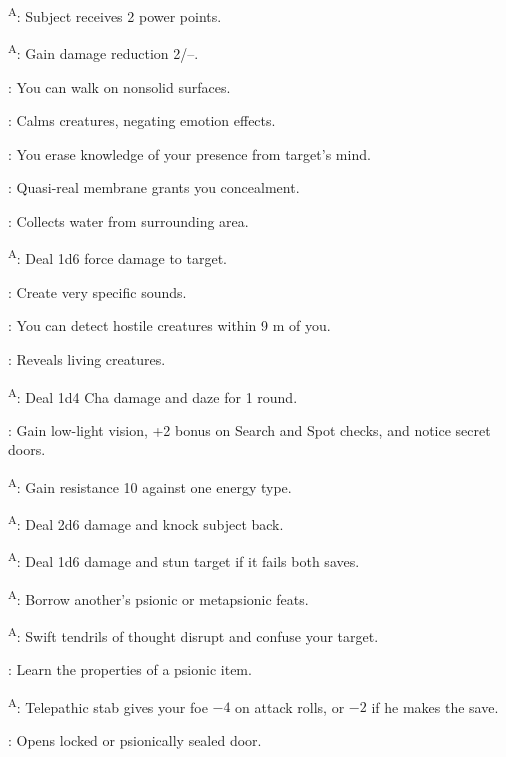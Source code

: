 \textsuperscript{A}: Subject receives 2 power points.

\textsuperscript{A}: Gain damage reduction 2/--.

: You can walk on nonsolid surfaces.

: Calms creatures, negating emotion effects.

: You erase knowledge of your presence from target's mind.

: Quasi-real membrane grants you concealment.

: Collects water from surrounding area.

\textsuperscript{A}: Deal 1d6 force damage to target.

: Create very specific sounds.

: You can detect hostile creatures within 9 m of you.

: Reveals living creatures.

\textsuperscript{A}: Deal 1d4 Cha damage and daze for 1 round.

: Gain low-light vision, +2 bonus on Search and Spot checks, and notice secret doors.

\textsuperscript{A}: Gain resistance 10 against one energy type.

\textsuperscript{A}: Deal 2d6 damage and knock subject back.

\textsuperscript{A}: Deal 1d6 damage and stun target if it fails both saves.

\textsuperscript{A}: Borrow another's psionic or metapsionic feats.

\textsuperscript{A}: Swift tendrils of thought disrupt and confuse your target.

: Learn the properties of a psionic item.

\textsuperscript{A}: Telepathic stab gives your foe $-4$ on attack rolls, or $-2$ if he makes the save.

: Opens locked or psionically sealed door.

